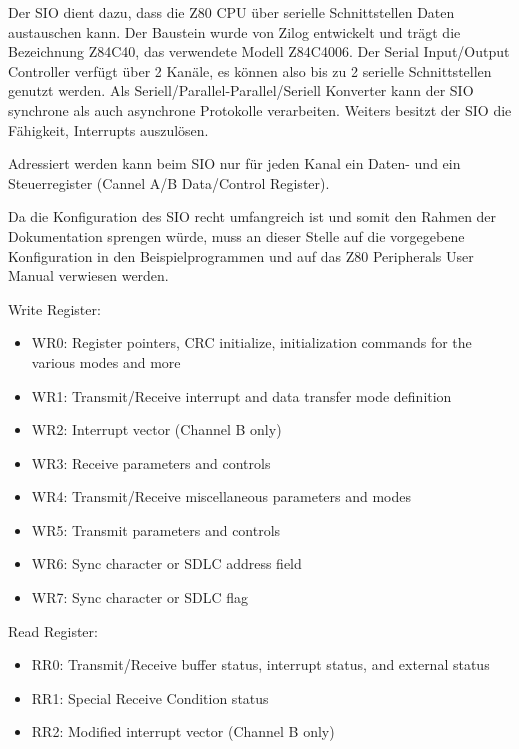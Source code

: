 Der SIO dient dazu, dass die Z80 CPU über serielle Schnittstellen Daten austauschen kann. Der Baustein wurde von Zilog entwickelt und trägt die Bezeichnung Z84C40, das verwendete Modell Z84C4006. Der Serial Input/Output Controller verfügt über 2 Kanäle, es können also bis zu 2 serielle Schnittstellen genutzt werden. Als Seriell/Parallel-Parallel/Seriell Konverter kann der SIO synchrone als auch asynchrone Protokolle verarbeiten. Weiters besitzt der SIO die Fähigkeit, Interrupts auszulösen.

Adressiert werden kann beim SIO nur für jeden Kanal ein Daten- und ein Steuerregister (Cannel A/B Data/Control Register).

Da die Konfiguration des SIO recht umfangreich ist und somit den Rahmen der Dokumentation sprengen würde, muss an dieser Stelle auf die vorgegebene Konfiguration in den Beispielprogrammen und auf das Z80 Peripherals User Manual verwiesen werden.

Write Register:
\begin{itemize}
    \item WR0: Register pointers, CRC initialize, initialization commands for the various modes and more
    \item WR1: Transmit/Receive interrupt and data transfer mode definition
    \item WR2: Interrupt vector (Channel B only)
    \item WR3: Receive parameters and controls
    \item WR4: Transmit/Receive miscellaneous parameters and modes
    \item WR5: Transmit parameters and controls
    \item WR6: Sync character or SDLC address field
    \item WR7: Sync character or SDLC flag
\end{itemize}

Read Register:

\begin{itemize}
    \item RR0: Transmit/Receive buffer status, interrupt status, and external status
    \item RR1: Special Receive Condition status
    \item RR2: Modified interrupt vector (Channel B only)
\end{itemize}

